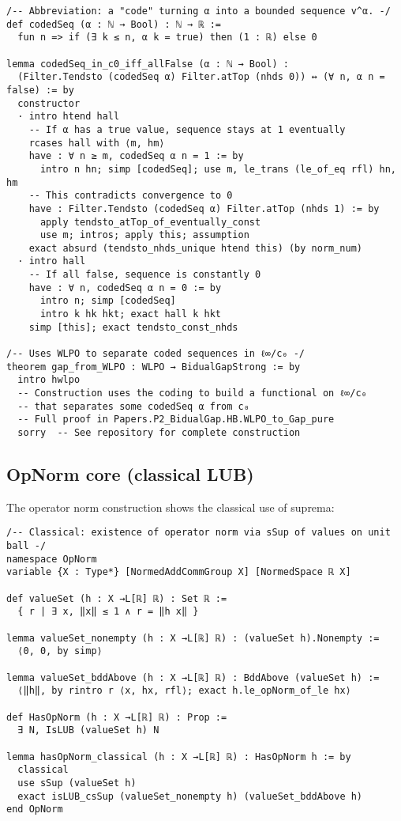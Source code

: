 \documentclass[11pt]{article}
\begin{document}
\begin{lstlisting}[caption={WLPO implies gap via coding},label={lst:wlpo-gap}]
/-- Abbreviation: a "code" turning α into a bounded sequence v^α. -/
def codedSeq (α : ℕ → Bool) : ℕ → ℝ :=
  fun n => if (∃ k ≤ n, α k = true) then (1 : ℝ) else 0

lemma codedSeq_in_c0_iff_allFalse (α : ℕ → Bool) :
  (Filter.Tendsto (codedSeq α) Filter.atTop (nhds 0)) ↔ (∀ n, α n = false) := by
  constructor
  · intro htend hall
    -- If α has a true value, sequence stays at 1 eventually
    rcases hall with ⟨m, hm⟩
    have : ∀ n ≥ m, codedSeq α n = 1 := by
      intro n hn; simp [codedSeq]; use m, le_trans (le_of_eq rfl) hn, hm
    -- This contradicts convergence to 0
    have : Filter.Tendsto (codedSeq α) Filter.atTop (nhds 1) := by
      apply tendsto_atTop_of_eventually_const
      use m; intros; apply this; assumption
    exact absurd (tendsto_nhds_unique htend this) (by norm_num)
  · intro hall
    -- If all false, sequence is constantly 0
    have : ∀ n, codedSeq α n = 0 := by
      intro n; simp [codedSeq]
      intro k hk hkt; exact hall k hkt
    simp [this]; exact tendsto_const_nhds

/-- Uses WLPO to separate coded sequences in ℓ∞/c₀ -/
theorem gap_from_WLPO : WLPO → BidualGapStrong := by
  intro hwlpo
  -- Construction uses the coding to build a functional on ℓ∞/c₀
  -- that separates some codedSeq α from c₀
  -- Full proof in Papers.P2_BidualGap.HB.WLPO_to_Gap_pure
  sorry  -- See repository for complete construction
\end{lstlisting}

\subsection{OpNorm core (classical LUB)}

The operator norm construction shows the classical use of suprema:

\begin{lstlisting}[caption={Classical operator norm via supremum},label={lst:opnorm}]
/-- Classical: existence of operator norm via sSup of values on unit ball -/
namespace OpNorm
variable {X : Type*} [NormedAddCommGroup X] [NormedSpace ℝ X]

def valueSet (h : X →L[ℝ] ℝ) : Set ℝ := 
  { r | ∃ x, ‖x‖ ≤ 1 ∧ r = ‖h x‖ }

lemma valueSet_nonempty (h : X →L[ℝ] ℝ) : (valueSet h).Nonempty := 
  ⟨0, 0, by simp⟩
  
lemma valueSet_bddAbove (h : X →L[ℝ] ℝ) : BddAbove (valueSet h) :=
  ⟨‖h‖, by rintro r ⟨x, hx, rfl⟩; exact h.le_opNorm_of_le hx⟩

def HasOpNorm (h : X →L[ℝ] ℝ) : Prop := 
  ∃ N, IsLUB (valueSet h) N

lemma hasOpNorm_classical (h : X →L[ℝ] ℝ) : HasOpNorm h := by
  classical
  use sSup (valueSet h)
  exact isLUB_csSup (valueSet_nonempty h) (valueSet_bddAbove h)
end OpNorm
\end{lstlisting}
\end{document}
